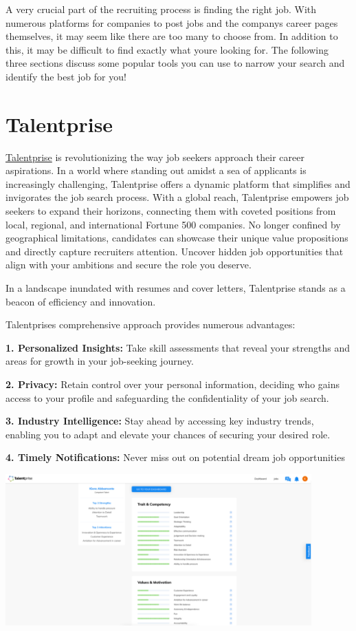 \documentclass[
]{book}
\begin{document}
A very crucial part of the recruiting process is finding the right job. With numerous platforms for companies to post jobs and the company\textquotesingle s career pages themselves, it may seem like there are too many to choose from. In addition to this, it may be difficult to find exactly what you\textquotesingle re looking for. The following three sections discuss some popular tools you can use to narrow your search and identify the best job for you!

\hypertarget{talentprise}{%
\section{Talentprise}\label{talentprise}}

\href{https://www.talentprise.com/}{Talentprise} is revolutionizing the way job seekers approach their career aspirations. In a world where standing out amidst a sea of applicants is increasingly challenging, Talentprise offers a dynamic platform that simplifies and invigorates the job search process. With a global reach, Talentprise empowers job seekers to expand their horizons, connecting them with coveted positions from local, regional, and international Fortune 500 companies. No longer confined by geographical limitations, candidates can showcase their unique value propositions and directly capture recruiters\textquotesingle{} attention. Uncover hidden job opportunities that align with your ambitions and secure the role you deserve.

In a landscape inundated with resumes and cover letters, Talentprise stands as a beacon of efficiency and innovation.

Talentprise\textquotesingle s comprehensive approach provides numerous advantages:

\textbf{1. Personalized Insights:} Take skill assessments that reveal your strengths and areas for growth in your job-seeking journey.

\textbf{2. Privacy:} Retain control over your personal information, deciding who gains access to your profile and safeguarding the confidentiality of your job search.

\textbf{3. Industry Intelligence:} Stay ahead by accessing key industry trends, enabling you to adapt and elevate your chances of securing your desired role.

\textbf{4. Timely Notifications:} Never miss out on potential dream job opportunities

\includegraphics[width=4.63542in,height=\textheight]{talentprise1.png}
\end{document}
